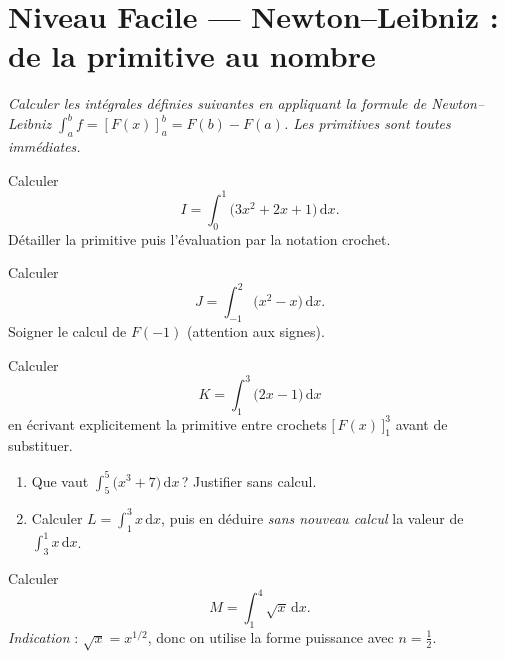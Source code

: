 \documentclass[11pt,a4paper]{article}
\newcommand{\dd}{\mathrm{d}}
\begin{document}
\section*{Niveau Facile — Newton--Leibniz : de la primitive au nombre}

\begin{center}
\itshape\small Calculer les intégrales définies suivantes en appliquant la formule de
Newton--Leibniz $\int_a^b f=[F(x)]_a^b=F(b)-F(a)$. Les primitives sont toutes immédiates.
\end{center}

\medskip

\begin{exo}
Calculer
\[
I=\int_0^1\bigl(3x^2+2x+1\bigr)\,\dd x.
\]
Détailler la primitive puis l'évaluation par la notation crochet.
\end{exo}

\begin{exo}
Calculer
\[
J=\int_{-1}^{2}\bigl(x^2-x\bigr)\,\dd x.
\]
Soigner le calcul de $F(-1)$ (attention aux signes).
\end{exo}

\begin{exo}
Calculer
\[
K=\int_{1}^{3}\bigl(2x-1\bigr)\,\dd x
\]
en écrivant explicitement la primitive entre crochets $\bigl[\,F(x)\,\bigr]_1^3$ avant de
substituer.
\end{exo}

\begin{exo}
\begin{enumerate}[label=\alph*),leftmargin=1.8em]
  \item Que vaut $\displaystyle\int_{5}^{5}\bigl(x^3+7\bigr)\,\dd x$\,? Justifier sans calcul.
  \item Calculer $\displaystyle L=\int_{1}^{3} x\,\dd x$, puis en déduire \emph{sans nouveau calcul}
        la valeur de $\displaystyle\int_{3}^{1} x\,\dd x$.
\end{enumerate}
\end{exo}

\begin{exo}
Calculer
\[
M=\int_{1}^{4}\sqrt{x}\,\dd x.
\]
\emph{Indication} : $\sqrt{x}=x^{1/2}$, donc on utilise la forme puissance avec $n=\tfrac12$.
\end{exo}
\end{document}
